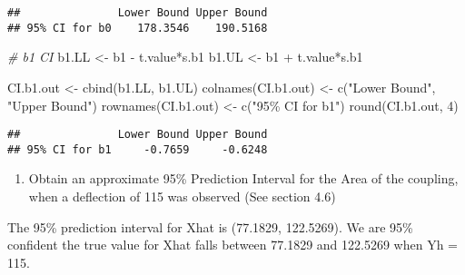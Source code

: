 \documentclass[
]{article}
\newenvironment{Shaded}{\begin{snugshade}}{\end{snugshade}}
\newcommand{\CommentTok}[1]{\textcolor[rgb]{0.56,0.35,0.01}{\textit{#1}}}
\newcommand{\DecValTok}[1]{\textcolor[rgb]{0.00,0.00,0.81}{#1}}
\newcommand{\FunctionTok}[1]{\textcolor[rgb]{0.00,0.00,0.00}{#1}}
\newcommand{\NormalTok}[1]{#1}
\newcommand{\OtherTok}[1]{\textcolor[rgb]{0.56,0.35,0.01}{#1}}
\newcommand{\SpecialCharTok}[1]{\textcolor[rgb]{0.00,0.00,0.00}{#1}}
\newcommand{\StringTok}[1]{\textcolor[rgb]{0.31,0.60,0.02}{#1}}
\providecommand{\tightlist}{%
  \setlength{\itemsep}{0pt}\setlength{\parskip}{0pt}}
\begin{document}
\begin{verbatim}
##               Lower Bound Upper Bound
## 95% CI for b0    178.3546    190.5168
\end{verbatim}

\begin{Shaded}
\begin{Highlighting}[]
\CommentTok{\# b1 CI}
\NormalTok{b1.LL }\OtherTok{\textless{}{-}}\NormalTok{ b1 }\SpecialCharTok{{-}}\NormalTok{ t.value}\SpecialCharTok{*}\NormalTok{s.b1}
\NormalTok{b1.UL }\OtherTok{\textless{}{-}}\NormalTok{ b1 }\SpecialCharTok{+}\NormalTok{ t.value}\SpecialCharTok{*}\NormalTok{s.b1}

\NormalTok{CI.b1.out }\OtherTok{\textless{}{-}} \FunctionTok{cbind}\NormalTok{(b1.LL, b1.UL)}
\FunctionTok{colnames}\NormalTok{(CI.b1.out) }\OtherTok{\textless{}{-}} \FunctionTok{c}\NormalTok{(}\StringTok{"Lower Bound"}\NormalTok{, }\StringTok{"Upper Bound"}\NormalTok{)}
\FunctionTok{rownames}\NormalTok{(CI.b1.out) }\OtherTok{\textless{}{-}} \FunctionTok{c}\NormalTok{(}\StringTok{"95\% CI for b1"}\NormalTok{)}
\FunctionTok{round}\NormalTok{(CI.b1.out, }\DecValTok{4}\NormalTok{)}
\end{Highlighting}
\end{Shaded}

\begin{verbatim}
##               Lower Bound Upper Bound
## 95% CI for b1     -0.7659     -0.6248
\end{verbatim}

\begin{enumerate}
\def\labelenumi{\alph{enumi})}
\setcounter{enumi}{11}
\tightlist
\item
  Obtain an approximate 95\% Prediction Interval for the Area of the
  coupling, when a deflection of 115 was observed (See section 4.6)
\end{enumerate}

The 95\% prediction interval for Xhat is (77.1829, 122.5269). We are
95\% confident the true value for Xhat falls between 77.1829 and
122.5269 when Yh = 115.
\end{document}
